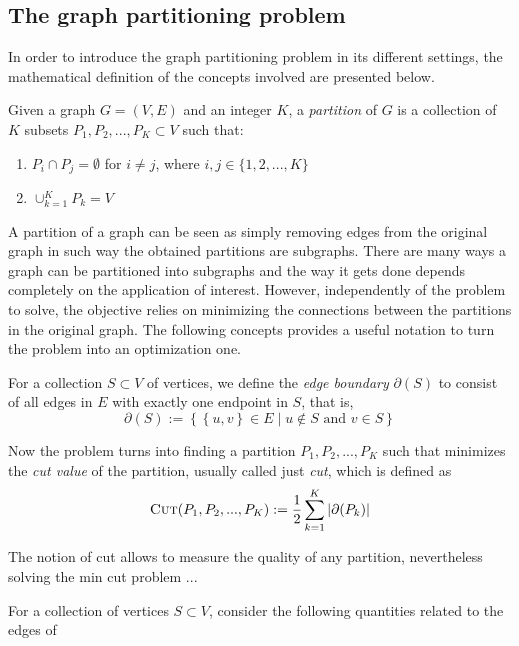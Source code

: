 \subsection{The graph partitioning problem}
In order to introduce the graph partitioning problem in its different settings, the mathematical definition of the concepts involved are presented below.
\begin{definition}
	Given a graph $G = (V, E)$ and an integer $K$, a \textit{partition} of $G$ is a collection of $K$ subsets $P_1, P_2, ..., P_K\subset V$ such that:
	\begin{enumerate}
		\item $P_i \cap P_j = \emptyset$ for $i\neq j$, where $i,j\in \{1,2,...,K\}$
		\item $\cup_{k=1}^K P_k = V$
	\end{enumerate}	 
\end{definition}
    A partition of a graph can be seen as simply removing edges from the original graph in such way the obtained partitions are subgraphs. There are many ways a graph can be partitioned into subgraphs and the way it gets done depends completely on the application of interest. However, independently of the problem to solve, the objective relies on minimizing the connections between the partitions in the original graph. The following concepts provides a useful notation to turn the problem into an optimization one.
    
	For a collection $S\subset V$ of vertices, we define the \textit{edge boundary} $\partial(S)$ to consist of all edges in $E$ with exactly one endpoint in $S$, that is,
	\begin{displaymath}
		\partial(S) := \left\{ \left\{u, v\right\}  \in E \mid u \notin S \text{ and } v\in S \right\}
	\end{displaymath}
	
	Now the problem turns into finding a partition $P_1, P_2, ..., P_K$ such that minimizes the \textit{cut value} of the partition, usually called just \textit{cut}, which is defined as
	\begin{equation}
	    \label{mincut}
	    \textsc{Cut}(P_1, P_2, ..., P_K) := \frac{1}{2} \sum_{k=1}^K \left|\partial(P_k)\right|
	\end{equation}
	
	The notion of cut allows to measure the quality of any partition, nevertheless solving the min cut problem ...

	For a collection of vertices $S\subset V$, consider the following quantities related to the edges of 
	
